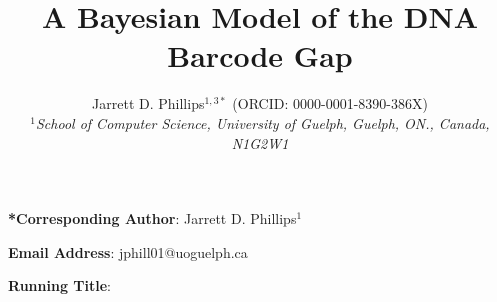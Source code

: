 \documentclass[12pt]{article}
\makeatletter
\renewcommand{\maketitle}{\bgroup\setlength{\parindent}{0pt}
\begin{flushleft}
  \textbf{\@title}

  \@author
\end{flushleft}\egroup
}
\makeatother
\begin{document}
\linenumbers

\title{A Bayesian Model of the DNA Barcode Gap}

\author{Jarrett D. Phillips$^{1, 3*}$ (ORCID: 0000-0001-8390-386X)  \\
\textit{$^1$School of Computer Science, University of Guelph, Guelph, ON., Canada, N1G2W1}}

\date{}

\maketitle

\vspace{2mm}

\noindent \textbf{*Corresponding Author}: Jarrett D. Phillips$^{1}$

\noindent \textbf{Email Address}: jphill01@uoguelph.ca

\noindent \textbf{Running Title}: 

\newpage
\end{document}
